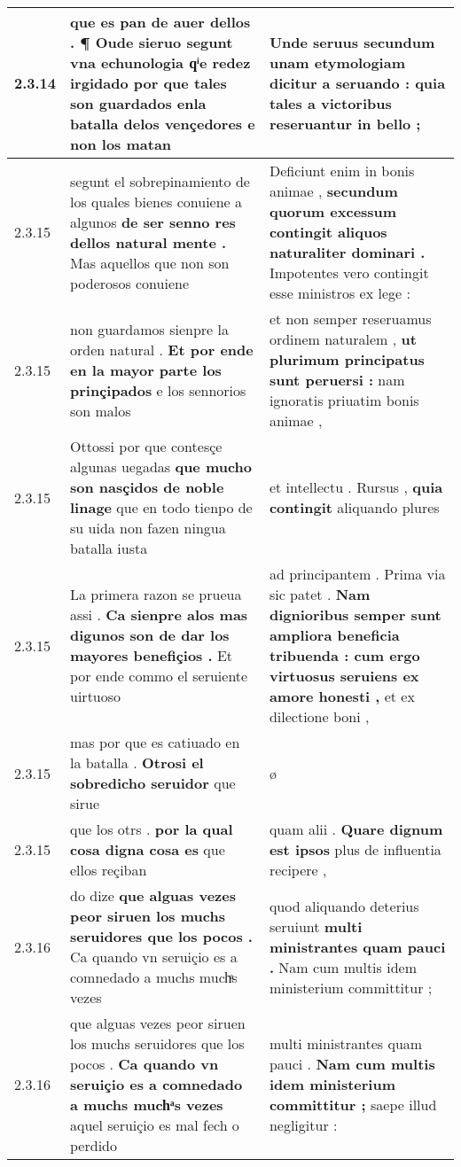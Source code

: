 \begin{tabular}{|p{1cm}|p{6.5cm}|p{6.5cm}|}
2.3.14 & que es pan de auer dellos . \textbf{ ¶ Oude sieruo segunt vna echunologia qͥe redez irgidado } por que tales son guardados enla batalla delos vençedores e non los matan & Unde seruus \textbf{ secundum unam etymologiam dicitur a seruando : } quia tales a victoribus reseruantur in bello ; \\\hline
2.3.15 & segunt el sobrepinamiento de los quales bienes conuiene a algunos \textbf{ de ser senno res dellos natural mente . } Mas aquellos que non son poderosos conuiene & Deficiunt enim in bonis animae , \textbf{ secundum quorum excessum contingit aliquos naturaliter dominari . } Impotentes vero contingit esse ministros ex lege : \\\hline
2.3.15 & non guardamos sienpre la orden natural . \textbf{ Et por ende en la mayor parte los prinçipados } e los sennorios son malos & et non semper reseruamus ordinem naturalem , \textbf{ ut plurimum principatus sunt peruersi : } nam ignoratis priuatim bonis animae , \\\hline
2.3.15 & Ottossi por que contesçe algunas uegadas \textbf{ que mucho son nasçidos de noble linage } que en todo tienpo de su uida non fazen ningua batalla iusta & et intellectu . Rursus , \textbf{ quia contingit } aliquando plures \\\hline
2.3.15 & La primera razon se prueua assi . \textbf{ Ca sienpre alos mas digunos son de dar los mayores benefiçios . } Et por ende commo el seruiente uirtuoso & ad principantem . Prima via sic patet . \textbf{ Nam dignioribus semper sunt ampliora beneficia tribuenda : cum ergo virtuosus seruiens ex amore honesti , } et ex dilectione boni , \\\hline
2.3.15 & mas por que es catiuado en la batalla . \textbf{ Otrosi el sobredicho seruidor } que sirue & ø \\\hline
2.3.15 & que los otrs . \textbf{ por la qual cosa digna cosa es } que ellos reçiban & quam alii . \textbf{ Quare dignum est ipsos } plus de influentia recipere , \\\hline
2.3.16 & do dize \textbf{ que alguas vezes peor siruen los muchs seruidores que los pocos . } Ca quando vn seruiçio es a comnedado a muchs muchͣs vezes & quod aliquando deterius seruiunt \textbf{ multi ministrantes quam pauci . } Nam cum multis idem ministerium committitur ; \\\hline
2.3.16 & que alguas vezes peor siruen los muchs seruidores que los pocos . \textbf{ Ca quando vn seruiçio es a comnedado a muchs muchͣs vezes } aquel seruiçio es mal fech o perdido & multi ministrantes quam pauci . \textbf{ Nam cum multis idem ministerium committitur ; } saepe illud negligitur : \\\hline

\end{tabular}
